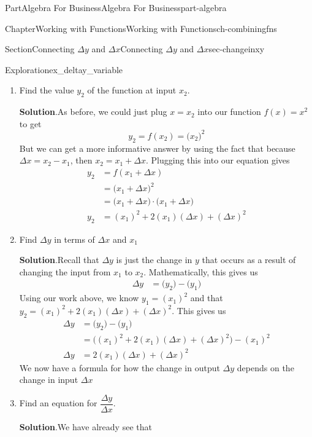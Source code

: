\documentclass{tufte-book}
\newcommand{\blocktitlefont}{\relax}
\numberwithin{equation}{chapter}
\newcommand{\amp}{&}
\begin{document}
\begin{partptx}{Part}{Algebra For Business}{}{Algebra For Business}{}{}{part-algebra}
\begin{chapterptx}{Chapter}{Working with Functions}{}{Working with Functions}{}{}{ch-combiningfns}
\begin{sectionptx}{Section}{\textasteriskcentered{}Connecting \(\Delta y\) and \(\Delta x\)}{}{\textasteriskcentered{}Connecting \(\Delta y\) and \(\Delta x\)}{}{}{sec-changeinxy}
\begin{exploration}{Exploration}{}{ex_deltay_variable}
\begin{enumerate}[font=\bfseries,label=(\alph*),ref=\alph*]
\begin{equation*}
y_1 = f(x_1) = \Big(x_1\Big)^2
\end{equation*}
%
\item{}Find the value \(y_2\) of the function at input \(x_2\).%
\par\smallskip%
\noindent\textbf{\blocktitlefont Solution}.\hypertarget{ex_deltay_variable-3-2}{}\quad{}As before, we could just plug \(x=x_2\) into our function \(f(x) = x^2\) to get%
\begin{equation*}
y_2 = f(x_2) = \Big(x_2\Big)^2
\end{equation*}
But we can get a more informative answer by using the fact that because \(\Delta x = x_2 - x_1\), then \(x_2 = x_1 + \Delta x\).  Plugging this into our equation gives%
\begin{align*}
y_2 \amp = f(x_1 + \Delta x)\\
\amp = \Big(x_1 + \Delta x\Big)^2 \\
\amp = \Big(x_1 + \Delta x\Big)\cdot \Big(x_1 + \Delta x\Big)\\
y_2 \amp = (x_1)^2 + 2(x_1)(\Delta x) + (\Delta x)^2
\end{align*}
%
\item{}Find \(\Delta y\) in terms of \(\Delta x\) and \(x_1\)%
\par\smallskip%
\noindent\textbf{\blocktitlefont Solution}.\hypertarget{ex_deltay_variable-4-2}{}\quad{}Recall that \(\Delta y\) is just the change in \(y\) that occurs as a result of changing the input from \(x_1\) to \(x_2\).  Mathematically, this gives us%
\begin{align*}
\Delta y \amp = \Big(y_2\Big) - \Big(y_1\Big)
\end{align*}
Using our work above, we know \(y_1 = (x_1)^2\) and that \(y_2 = (x_1)^2 + 2(x_1)(\Delta x) + (\Delta x)^2\).  This gives us%
\begin{align*}
\Delta y \amp = \Big(y_2\Big) - \Big(y_1\Big)\\
\amp = \Big((x_1)^2 + 2(x_1)(\Delta x) + (\Delta x)^2\Big) - (x_1)^2\\
\Delta y \amp = 2(x_1)(\Delta x)+(\Delta x)^2
\end{align*}
We now have a formula for how the change in output \(\Delta y\) depends on the change in input \(\Delta x\)%
\item{}Find an equation for \(\dfrac{\Delta y}{\Delta x}\).%
\par\smallskip%
\noindent\textbf{\blocktitlefont Solution}.\hypertarget{ex_deltay_variable-5-2}{}\quad{}We have already see that%

\end{enumerate}
\end{exploration}
\end{sectionptx}
\end{chapterptx}
\end{partptx}
\end{document}
